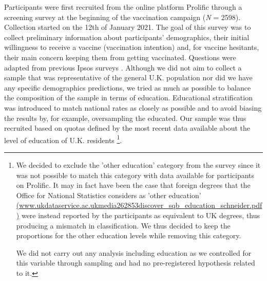 \documentclass[authordate, empirical]{jote-new-article}
\begin{document}
Participants were first recruited from the online platform Prolific through a screening survey at the beginning of the vaccination campaign (\emph{N }= 2598). Collection started on the 12th of January 2021. The goal of this survey was to collect preliminary information about participants' demographics, their initial willingness to receive a vaccine (vaccination intention) and, for vaccine hesitants, their main concern keeping them from getting vaccinated. Questions were adapted from previous Ipsos surveys \parencites{Boyon2021}. Although we did not aim to collect a sample that was representative of the general U.K. population nor did we have any specific demographics predictions, we tried as much as possible to balance the composition of the sample in terms of education. Educational stratification was introduced to match national rates as closely as possible and to avoid biasing the results by, for example, oversampling the educated. Our sample was thus recruited based on quotas defined by the most recent data available about the level of education of U.K. residents \parencites[][]{forNationalStatistics2019}\footnote{We decided to exclude the 'other education' category from the survey since it was not possible to match this category with data available for participants on Prolific. It may in fact have been the case that foreign degrees that the Office for National Statistics considers as 'other education' \href{https://www.ukdataservice.ac.uk/media/262853/discover_sqb_education_schneider.pdf}{(www.ukdataservice.ac.ukmedia262853discover\_sqb\_education\_schneider.pdf)} were instead reported by the participants as equivalent to UK degrees, thus producing a mismatch in classification. We thus decided to keep the proportions for the other education levels while removing this category. \par
  We did not carry out any analysis including education as we controlled for this variable through sampling and had no pre-registered hypothesis related to it.}.
\end{document}
